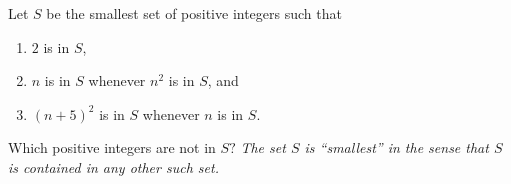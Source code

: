 Let $S$ be the smallest set of positive integers such that
\begin{enumerate}[label = (\alph*)]
	\item $2$ is in $S$,
	\item $n$ is in $S$ whenever $n^2$ is in $S$, and
	\item $(n+5)^2$ is in $S$ whenever $n$ is in $S$.
\end{enumerate}

Which positive integers are not in $S?$ \emph{The set $S$ is ``smallest'' in the sense that $S$ is contained in any other such set.}

